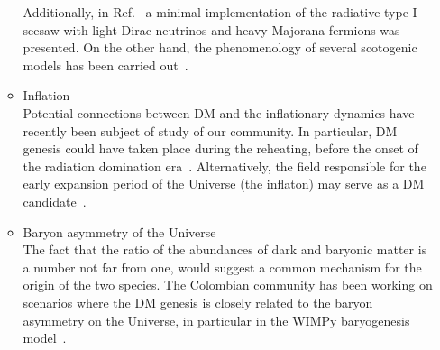 \documentclass[a4paper,11pt]{article}
\begin{document}
\begin{enumerate}
\begin{itemize}
Additionally, in Ref.~\cite{Calle:2019mxn} a minimal implementation of the radiative type-I seesaw with light Dirac neutrinos and heavy Majorana fermions was presented. On the other hand, the phenomenology of several scotogenic models has been carried out~\cite{Sierra:2008wj, Molinaro:2014lfa, Restrepo:2015ura, Ibarra:2016dlb, vonderPahlen:2016cbw, Betancur:2017dhy, Reig:2018mdk, Reig:2018ztc, Bernal:2018aon, Restrepo:2019soi, Restrepo:2019ilz}.
%
\item
Inflation\\
Potential connections between DM and the inflationary dynamics have recently been subject of study of our community.
In particular, DM genesis could have taken place during the reheating, before the onset of the radiation domination era~\cite{Bernal:2018hjm, Bernal:2018qlk, Bernal:2020bfj, Bernal:2020qyu}.
Alternatively, the field responsible for the early expansion period of the Universe (the inflaton) may serve as a DM candidate~\cite{Almeida:2018oid}.
%
\item
Baryon asymmetry of the Universe\\
The fact that the ratio of the abundances of dark and baryonic matter is a number not far from one, would suggest a common mechanism for the origin of the two species.
The Colombian community has been working on scenarios where the DM genesis is closely related to the baryon asymmetry on the Universe, in particular in the WIMPy baryogenesis model~\cite{Bernal:2012gv, Bernal:2013bga, Bernal:2016gfn, Bernal:2017zvx}.
\end{itemize}
\end{enumerate}
%
\end{document}

